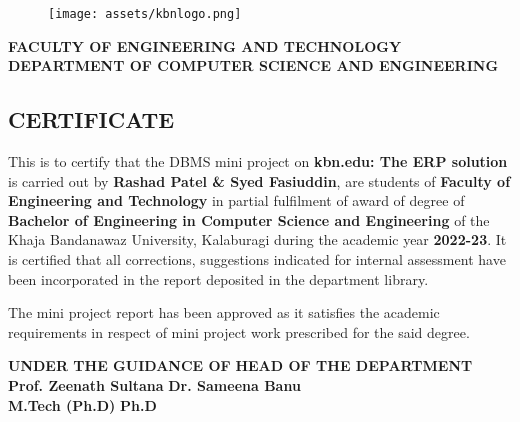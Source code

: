 \begin{center}
    \begin{figure}[h]
        \begin{center}
            \texttt{[image: assets/kbnlogo.png]}
        \end{center}
    \end{figure}
    \textbf{FACULTY OF ENGINEERING AND TECHNOLOGY\\
    DEPARTMENT OF COMPUTER SCIENCE AND ENGINEERING}
    \textcolor{RawSienna}{\section*{CERTIFICATE}}
\end{center}

This is to certify that the DBMS mini project on
\textcolor{RawSienna}{\textbf{kbn.edu: The ERP solution}}
is carried out by
\textcolor{Cerulean}{\textbf{Rashad Patel \& Syed Fasiuddin}},
are students of
\textbf{Faculty of Engineering and Technology}
in partial fulfilment of award of degree of
\textbf{Bachelor of Engineering in Computer Science and Engineering}
of the Khaja Bandanawaz University, Kalaburagi during the academic year
\textbf{2022-23}.
It is certified that all corrections, suggestions indicated for internal
assessment have been incorporated in the report deposited in the department
library.

The mini project report has been approved as it satisfies the academic
requirements in respect of mini project work prescribed for the said degree.

\vskip 0.5in
\begin{flushleft}
\textbf{UNDER THE GUIDANCE OF} \hfill \textbf{HEAD OF THE DEPARTMENT}\\

\textcolor{RawSienna}{
    \vskip 0.8in
    \textbf{Prof. Zeenath Sultana} \hfill \textbf{Dr. Sameena Banu}\\
    \hskip 0.8in \footnotesize \textbf{M.Tech (Ph.D)} \hfill \textbf{Ph.D}
}
\end{flushleft}
